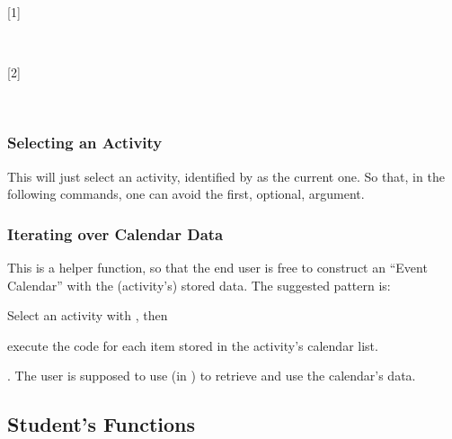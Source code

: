 \documentclass[10pt]{article}
\begin{document}
[1]

~

[2]


~

\subsubsection{Selecting an Activity}

\begin{codedescribe}{\ActivitySelect}
  \begin{codesyntax}
  \end{codesyntax}
  This will just select an activity, identified by  as the current one. So that, in the following commands, one can avoid the first, optional, argument.
\end{codedescribe}





\subsubsection{Iterating over Calendar Data}

\begin{codedescribe}{\ActivityCalendarIterate}
  \begin{codesyntax}
  \end{codesyntax}
  This is a helper function, so that the end user is free to construct an ``Event Calendar'' with the (activity's) stored data. The suggested pattern is: 
  \begin{enumerate*}
    \item Select an activity with \tsobj{\ActivitySelect}, then
    \item execute the code for each item stored in the activity's calendar list.
  \end{enumerate*}. The user is supposed to use (in ) \tsobj[code,sep=or]{\DataField,\DataGet} to retrieve and use the calendar's data.
\end{codedescribe}



\subsection{Student's Functions}
\end{document}
